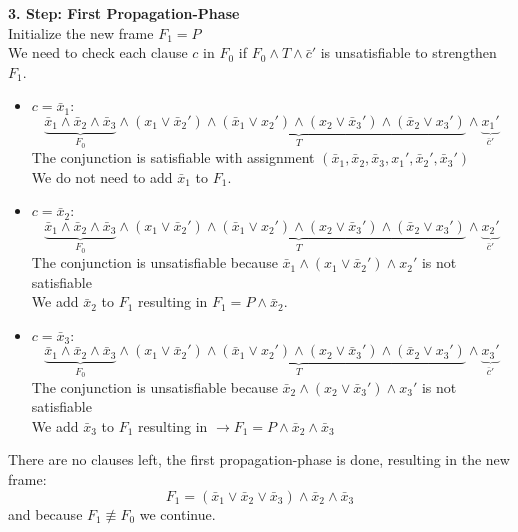 \documentclass[11pt, a4paper, BCOR=10mm, ngerman]{scrbook}
\begin{document}
\textbf{3. Step: First Propagation-Phase} \\
Initialize the new frame $F_1 = P$ \\
We need to check each clause $c$ in $F_0$ if $F_0 \land T \land \bar c'$ is unsatisfiable to strengthen $F_1$.
\begin{itemize}
\item $c = \bar x_1:$
\begin{equation*}
\underbrace{\bar x_1 \land \bar x_2 \land \bar x_3}_{F_0} \land \underbrace{(x_1 \lor \bar x_2' ) \land ( \bar x_1 \lor x_2') \land (x_2 \lor \bar x_3') \land ( \bar x_2 \lor x_3')}_{T} \land \underbrace{x_1'}_{\bar c'}
\end{equation*}
The conjunction is satisfiable with assignment $(\bar x_1, \bar x_2, \bar x_3, x_1', \bar x_2', \bar x_3')$ \\ 
We do not need to add $\bar x_1$ to $F_1$. \\

\item $c = \bar x_2:$
\begin{equation*}
\underbrace{\bar x_1 \land \bar x_2 \land \bar x_3}_{F_0} \land \underbrace{(x_1 \lor \bar x_2' ) \land ( \bar x_1 \lor x_2') \land (x_2 \lor \bar x_3') \land ( \bar x_2 \lor x_3')}_{T} \land \underbrace{x_2'}_{\bar c'}
\end{equation*}
The conjunction is unsatisfiable because $\bar x_1 \land (x_1 \lor \bar x_2') \land x_2'$ is not satisfiable \\ We add $\bar x_2$ to $F_1$ resulting in $F_1 = P \land \bar x_2$. \\

\item $c = \bar x_3:$
\begin{equation*}
\underbrace{\bar x_1 \land \bar x_2 \land \bar x_3}_{F_0} \land \underbrace{(x_1 \lor \bar x_2' ) \land ( \bar x_1 \lor x_2') \land (x_2 \lor \bar x_3') \land ( \bar x_2 \lor x_3')}_{T} \land \underbrace{x_3'}_{\bar c'}
\end{equation*}
The conjunction is unsatisfiable because $\bar x_2 \land (x_2 \lor \bar x_3') \land x_3'$ is not satisfiable \\ We add $\bar x_3$ to $F_1$ resulting in $\rightarrow F_1 = P \land \bar x_2 \land \bar x_3$
\end{itemize}
There are no clauses left, the first propagation-phase is done, resulting in the new frame:
\begin{equation*}
 F_1 = (\bar x_1 \lor \bar x_2 \lor \bar x_3) \land \bar x_2 \land \bar x_3
\end{equation*}
and because $F_1 \not\equiv F_0$ we continue. \\ \\ \par
\end{document}
